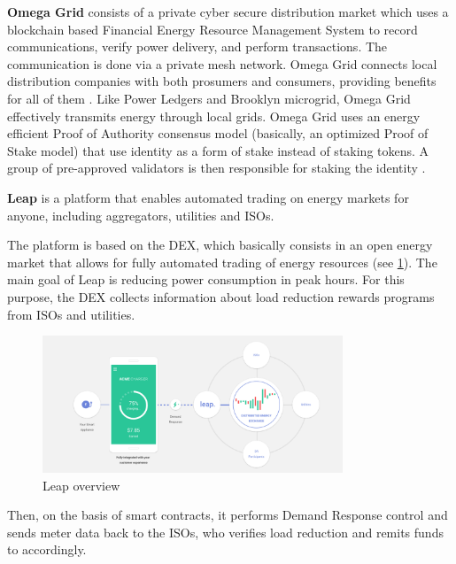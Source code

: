 \textbf{Omega Grid} consists of a private cyber secure distribution market \cite{STARTUPSWHOISWHO} which uses a blockchain based Financial Energy Resource Management System  to record communications, verify power delivery, and perform transactions. The communication is done via a private mesh network. Omega Grid connects local distribution companies with both prosumers and consumers, providing benefits for all of them \cite{omegagrid}. Like Power Ledgers and Brooklyn microgrid, Omega Grid effectively transmits energy through local grids. Omega Grid uses an energy efficient Proof of Authority consensus model (basically, an optimized Proof of Stake model) that use identity as a form of stake instead of  staking tokens. A group of pre-approved validators is then responsible for staking the identity \cite{poa}. 




\textbf{Leap} is a platform that enables automated trading on energy markets for anyone, including aggregators, utilities and \acp{ISO}.


The platform is based on the \ac{DEX}, which basically consists in an open energy market that allows for fully automated trading of energy resources \cite{leap} (see \cref{fig:leap}). The main goal of Leap is reducing power consumption in peak hours. For this purpose, the \ac{DEX} collects  information about load reduction rewards programs from \acp{ISO} and utilities.


\begin{figure}[h]
\centering
\includegraphics[width=0.8\textwidth]{./Images/leap}
\caption{Leap overview}
\label{fig:leap}
\end{figure}

Then, on the basis of smart contracts, it performs Demand Response control and sends meter data back to the \acp{ISO}, who verifies load reduction and remits funds to accordingly. 


